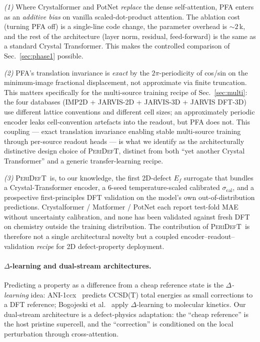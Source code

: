\documentclass[11pt,a4paper]{article}
\newcommand{\modelname}{\textsc{PeriDefT}}
\begin{document}
\textit{(1)} Where Crystalformer and PotNet \emph{replace} the
dense self-attention, PFA enters as an \emph{additive bias} on
vanilla scaled-dot-product attention. The ablation cost (turning
PFA off) is a single-line code change, the parameter overhead is
$\sim 2$\,k, and the rest of the architecture (layer norm, residual,
feed-forward) is the same as a standard Crystal Transformer. This
makes the controlled comparison of Sec.~\ref{sec:phase1} possible.

\textit{(2)} PFA's translation invariance is \emph{exact} by the
$2\pi$-periodicity of cos/sin on the minimum-image fractional
displacement, not approximate via finite truncation. This matters
specifically for the multi-source training recipe of
Sec.~\ref{sec:multi}: the four databases (IMP2D + JARVIS-2D +
JARVIS-3D + JARVIS DFT-3D) use different lattice conventions and
different cell sizes; an approximately periodic encoder leaks
cell-convention artefacts into the readout, but PFA does not.
This coupling --- exact translation invariance enabling stable
multi-source training through per-source readout heads --- is what
we identify as the architecturally distinctive design choice of
\modelname, distinct from both ``yet another Crystal Transformer''
and a generic transfer-learning recipe.

\textit{(3)} \modelname\ is, to our knowledge, the first 2D-defect
$E_f$ surrogate that bundles a Crystal-Transformer encoder, a
6-seed temperature-scaled calibrated $\sigma_{\mathrm{cal}}$, and
a prospective first-principles DFT validation on the model's own
out-of-distribution predictions. Crystalformer / Matformer / PotNet
each report test-fold MAE without uncertainty calibration, and
none has been validated against fresh DFT on chemistry outside the
training distribution. The contribution of \modelname\ is therefore
not a single architectural novelty but a coupled
encoder--readout--validation \emph{recipe} for 2D defect-property
deployment.

\paragraph{$\Delta$-learning and dual-stream architectures.}
Predicting a property as a difference from a cheap reference state
is the \emph{$\Delta$-learning} idea: ANI-1ccx~\cite{Smith2019ANI1ccx}
predicts CCSD(T) total energies as small corrections to a DFT
reference; Bogojeski et al.~\cite{Bogojeski2020Delta} apply
$\Delta$-learning to molecular kinetics. Our dual-stream architecture
is a defect-physics adaptation: the ``cheap reference'' is the host
pristine supercell, and the ``correction'' is conditioned on the
local perturbation through cross-attention.
\end{document}

